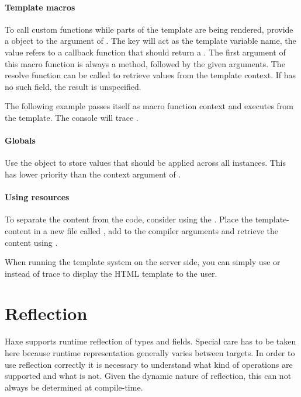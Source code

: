 \paragraph{Template macros}
To call custom functions while parts of the template are being rendered, provide a  object to the argument of . The key will act as the template variable name, the value refers to a callback function that should return a . The first argument of this macro function is always a  method, followed by the given arguments. The resolve function can be called to retrieve values from the template context. If  has no such field, the result is unspecified.

The following example passes itself as macro function context and executes  from the template.
The console will trace .

\paragraph{Globals}
Use the  object to store values that should be applied across all  instances. This has lower priority than the context argument of .

\paragraph{Using resources}

To separate the content from the code, consider using the . 
Place the template-content in a new file called , add  to the compiler arguments and retrieve the content using .

When running the template system on the server side, you can simply use  or  instead of trace to display the HTML template to the user.


\section{Reflection}
\label{std-reflection}

Haxe supports runtime reflection of types and fields. Special care has to be taken here because runtime representation generally varies between targets. In order to use reflection correctly it is necessary to understand what kind of operations are supported and what is not. Given the dynamic nature of reflection, this can not always be determined at compile-time.

